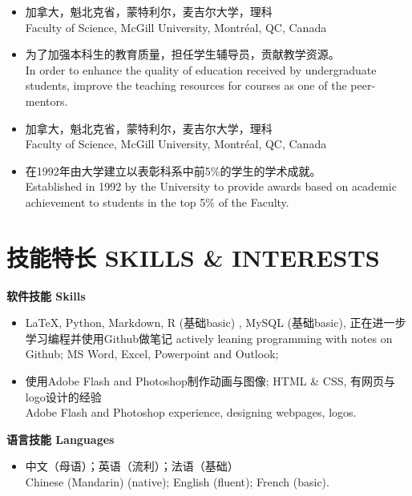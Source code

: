 \documentclass[12pt]{CV_CN} %
\begin{document}
 
\begin{itemize} 
	\item 加拿大，魁北克省，蒙特利尔，麦吉尔大学，理科\\
	Faculty of Science, McGill University, Montr\'eal, QC, Canada
	\item 为了加强本科生的教育质量，担任学生辅导员，贡献教学资源。\\
	In order to enhance the quality of education received by undergraduate students, improve the teaching resources for courses as one of the peer-mentors. 
\end{itemize}

\begin{itemize} 
	\item 加拿大，魁北克省，蒙特利尔，麦吉尔大学，理科\\
	Faculty of Science, McGill University, Montr\'eal, QC, Canada
	\item 在1992年由大学建立以表彰科系中前5\%的学生的学术成就。\\
	Established in 1992 by the University to provide awards based on academic achievement to students in the top 5\% of the Faculty. 
\end{itemize}

\section{技能特长 SKILLS \& INTERESTS}
\vspace{-0.5em}
\textbf{软件技能 Skills}
\begin{itemize}[topsep=-1em, itemsep=0.3em, parsep=0pt, partopsep=1em]
	  \item \LaTeX, Python, Markdown, R (基础basic) , MySQL (基础basic), 正在进一步学习编程并使用Github做笔记 actively leaning programming with notes on Github; MS Word, Excel, Powerpoint and Outlook;
	\item 使用Adobe Flash and Photoshop制作动画与图像; HTML \& CSS, 有网页与logo设计的经验\\
	Adobe Flash and Photoshop experience, designing webpages, logos. %
\end{itemize}

\vspace{1em}
\textbf{语言技能 Languages}
\begin{itemize}[topsep=-1em, itemsep=0.3em, parsep=0pt, partopsep=1em]
	\item  中文（母语）；英语（流利）；法语（基础）\\
	Chinese (Mandarin) (native); English (fluent); French (basic).
\end{itemize}
\end{document}
